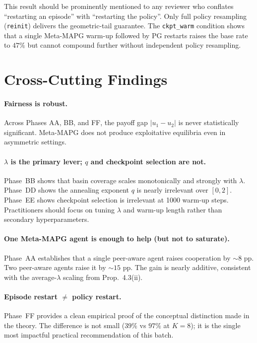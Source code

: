 \documentclass[11pt,a4paper]{article}
\begin{document}
This result should be prominently mentioned to any reviewer who conflates
``restarting an episode'' with ``restarting the policy''. Only full policy
resampling (\texttt{reinit}) delivers the geometric-tail guarantee.
The \texttt{ckpt\_warm} condition shows that a single Meta-MAPG warm-up
followed by PG restarts raises the base rate to $47\%$ but cannot compound
further without independent policy resampling.

\section{Cross-Cutting Findings}
\label{sec:crosscut}

\paragraph{Fairness is robust.}
Across Phases AA, BB, and FF, the payoff gap $|u_1-u_2|$ is never
statistically significant. Meta-MAPG does not produce exploitative equilibria
even in asymmetric settings.

\paragraph{$\lambda$ is the primary lever; $q$ and checkpoint selection are not.}
Phase~BB shows that basin coverage scales monotonically and strongly with
$\lambda$. Phase~DD shows the annealing exponent $q$ is nearly irrelevant
over $[0,2]$. Phase~EE shows checkpoint selection is irrelevant at 1000 warm-up
steps. Practitioners should focus on tuning $\lambda$ and warm-up length rather
than secondary hyperparameters.

\paragraph{One Meta-MAPG agent is enough to help (but not to saturate).}
Phase~AA establishes that a single peer-aware agent raises cooperation by
$\sim\!8$ pp. Two peer-aware agents raise it by $\sim\!15$ pp. The gain is
nearly additive, consistent with the average-$\lambda$ scaling from Prop.~4.3(ii).

\paragraph{Episode restart $\neq$ policy restart.}
Phase~FF provides a clean empirical proof of the conceptual distinction
made in the theory. The difference is not small ($39\%$ vs $97\%$ at $K=8$);
it is the single most impactful practical recommendation of this batch.
\end{document}
